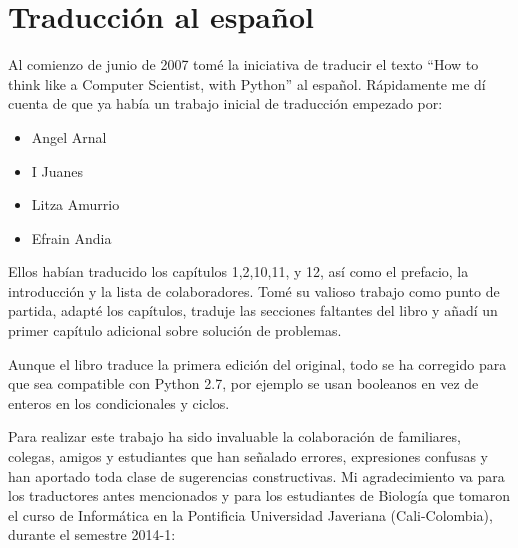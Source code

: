 


\chapter{Traducción al español}


Al comienzo de junio de 2007 tomé la iniciativa de traducir el texto 
``How to think like a Computer Scientist, with Python'' al español. Rápidamente
me dí cuenta de que ya había un trabajo inicial de traducción empezado por:

\begin{itemize}

\item Angel Arnal
\item I Juanes
\item Litza Amurrio
\item Efrain Andia

\end{itemize}

Ellos habían traducido los capítulos 1,2,10,11, y 12, así como el prefacio,
la introducción y la lista de colaboradores. Tomé su valioso trabajo como
punto de partida, adapté los capítulos, traduje las secciones faltantes 
del libro y añadí un primer capítulo adicional sobre solución de problemas.

Aunque el libro traduce la primera edición del original,
todo se ha corregido para que sea compatible con Python 2.7,
por ejemplo se usan booleanos en vez de enteros en los 
condicionales y ciclos. 

Para realizar este trabajo ha sido invaluable la colaboración de familiares, 
colegas, amigos y estudiantes que han señalado errores, expresiones confusas y han 
aportado toda clase de sugerencias constructivas. Mi agradecimiento va para los
traductores antes mencionados y para los estudiantes de Biología que tomaron 
el curso de Informática en la Pontificia Universidad Javeriana (Cali-Colombia), 
durante el semestre 2014-1:

